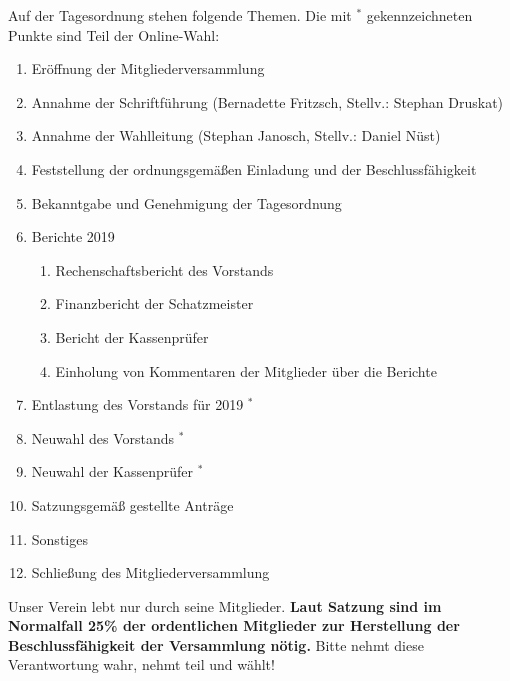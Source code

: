 \documentclass[../Vorlagen/de-RSE_Brief,a4paper]{scrlttr2}
\begin{document}
\begin{letter}{\mbox{}
}
\clearpage
\vspace{2em}
Auf der Tagesordnung stehen folgende Themen. Die mit ${}^*$ gekennzeichneten Punkte sind Teil der Online-Wahl:
\begin{enumerate}
\setlength\itemsep{0em}
\item Eröffnung der Mitgliederversammlung
\item Annahme der Schriftführung (Bernadette Fritzsch, Stellv.: Stephan Druskat)
\item Annahme der Wahlleitung (Stephan Janosch, Stellv.: Daniel Nüst)
\item Feststellung der ordnungsgemäßen Einladung und der Beschlussfähigkeit
\item Bekanntgabe und Genehmigung der Tagesordnung
\item Berichte 2019
\begin{enumerate}
 \item Rechenschaftsbericht des Vorstands
 \item Finanzbericht der Schatzmeister
 \item Bericht der Kassenprüfer
 \item Einholung von Kommentaren der Mitglieder über die Berichte
\end{enumerate}
\item Entlastung des Vorstands für 2019 ${}^*$
\item Neuwahl des Vorstands ${}^*$
\item Neuwahl der Kassenprüfer ${}^*$
\item Satzungsgemäß gestellte Anträge
\item Sonstiges
\item Schließung des Mitgliederversammlung
\end{enumerate}

Unser Verein lebt nur durch seine Mitglieder.
\textbf{Laut Satzung sind im Normalfall 25\% der ordentlichen Mitglieder zur Herstellung der Beschlussfähigkeit der Versammlung nötig.}
Bitte nehmt diese Verantwortung wahr, nehmt teil und wählt!


\end{letter}
\end{document}
